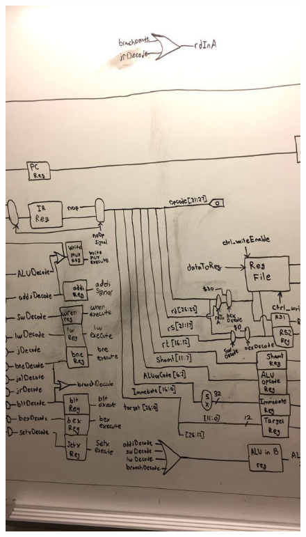 \documentclass[letterpaper]{article} %
\begin{document}
  \begin{figure}[!htb]
        \includegraphics[scale=.4]{Decode1.jpg}
        \label{fig:2}
    \end{figure}
\end{document}
